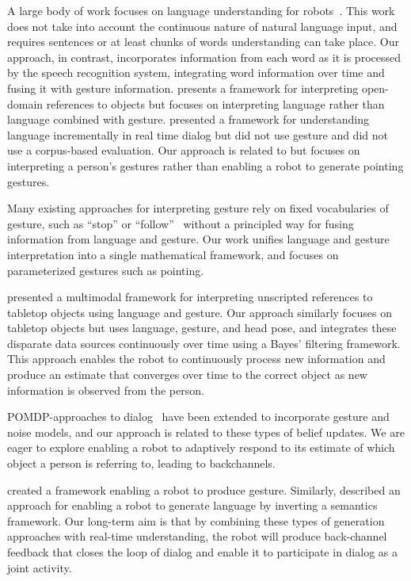 \documentclass[letterpaper, 10 pt, conference]{ieeeconf}
\begin{document}
A large body of work focuses on language understanding for
robots~\citep{macmahon06, dzifcak09, kollar10, matuszek12}.  This work
does not take into account the continuous nature of natural language
input, and requires sentences or at least chunks of words
understanding can take place.  Our approach, in contrast, incorporates
information from each word as it is processed by the speech
recognition system, integrating word information over time and fusing
it with gesture information.  \citet{guadarrama14} presents a
framework for interpreting open-domain references to objects but
focuses on interpreting language rather than language combined with
gesture.  \citet{cantrell10} presented a framework for understanding
language incrementally in real time dialog but did not use gesture and
did not use a corpus-based evaluation.  Our approach is related to
\citet{holladay14} but focuses on interpreting a person's gestures
rather than enabling a robot to generate pointing gestures.

Many existing approaches for interpreting gesture rely on fixed
vocabularies of gesture, such as ``stop'' or
``follow''~\citep{waldherr00, marge11} without a principled way for
fusing information from language and gesture.  Our work unifies
language and gesture interpretation into a single mathematical
framework, and focuses on parameterized gestures such as pointing.






\citet{matuszek14} presented a multimodal framework for interpreting
unscripted references to tabletop objects using language and gesture.
Our approach similarly focuses on tabletop objects but uses language,
gesture, and head pose, and integrates these disparate data sources
continuously over time using a Bayes' filtering framework.  This
approach enables the robot to continuously process new information and
produce an estimate that converges over time to the correct object as
new information is observed from the person.  

POMDP-approaches to dialog~\citet{young13, young10} have been extended
to incorporate gesture and noise models, and our approach is related
to these types of belief updates.  We are eager to explore enabling a
robot to adaptively respond to its estimate of which object a person
is referring to, leading to backchannels.

\citet{dragan13} created a framework enabling a robot to produce
gesture.  Similarly, \citet{tellex14} described an approach for
enabling a robot to generate language by inverting a semantics
framework.  Our long-term aim is that by combining these types of
generation approaches with real-time understanding, the robot will
produce back-channel feedback that closes the loop of dialog and
enable it to participate in dialog as a joint activity.
\end{document}
